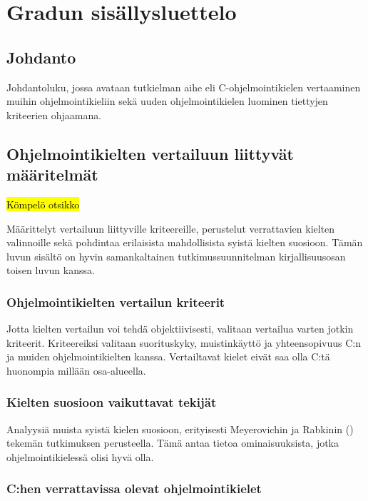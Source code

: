 \section{Gradun sisällysluettelo}

\subsection{Johdanto}

Johdantoluku, jossa avataan tutkielman aihe eli C-ohjelmointikielen vertaaminen
muihin ohjelmointikieliin sekä uuden ohjelmointikielen luominen tiettyjen
kriteerien ohjaamana.

\subsection{Ohjelmointikielten vertailuun liittyvät määritelmät}

\hl{Kömpelö otsikko}

Määrittelyt vertailuun liittyville kriteereille, perustelut verrattavien
kielten valinnoille sekä pohdintaa erilaisista mahdollisista syistä kielten
suosioon. Tämän luvun sisältö on hyvin samankaltainen tutkimussuunnitelman
kirjallisuusosan toisen luvun kanssa.

\subsubsection{Ohjelmointikielten vertailun kriteerit}

Jotta kielten vertailun voi tehdä objektiivisesti, valitaan vertailua varten
jotkin kriteerit. Kriteereiksi valitaan suorituskyky, muistinkäyttö ja
yhteensopivuus C:n ja muiden ohjelmointikielten kanssa. Vertailtavat kielet
eivät saa olla C:tä huonompia millään osa-alueella.

\subsubsection{Kielten suosioon vaikuttavat tekijät}

Analyysiä muista syistä kielen suosioon, erityisesti Meyerovichin ja Rabkinin
(\citeyear{empiricalpopularity}) tekemän tutkimuksen perusteella. Tämä antaa
tietoa ominaisuuksista, jotka ohjelmointikielessä olisi hyvä olla.

\subsubsection{C:hen verrattavissa olevat ohjelmointikielet}


